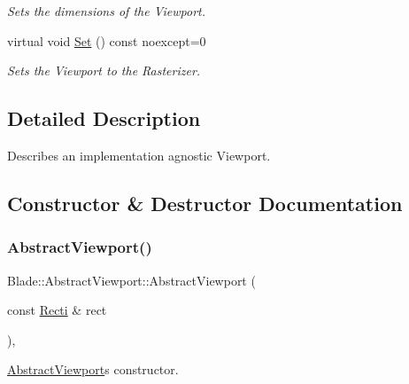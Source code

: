 \begin{DoxyCompactItemize}
\begin{DoxyCompactList}\small\item\em Sets the dimensions of the Viewport. \end{DoxyCompactList}\item 
\mbox{\label{class_blade_1_1_abstract_viewport_a5ea486e1fbae3f6725cac10353644f24}} 
virtual void \hyperlink{class_blade_1_1_abstract_viewport_a5ea486e1fbae3f6725cac10353644f24}{Set} () const noexcept=0
\begin{DoxyCompactList}\small\item\em Sets the Viewport to the Rasterizer. \end{DoxyCompactList}\end{DoxyCompactItemize}


\subsection{Detailed Description}
Describes an implementation agnostic Viewport. 

\subsection{Constructor \& Destructor Documentation}
\mbox{\label{class_blade_1_1_abstract_viewport_aa04544ba6e933bc0e6c2e6ca878d4541}} 
\subsubsection{\texorpdfstring{Abstract\+Viewport()}{AbstractViewport()}}
{\footnotesize\ttfamily Blade\+::\+Abstract\+Viewport\+::\+Abstract\+Viewport (\begin{DoxyParamCaption}\item[{const \hyperlink{namespace_blade_ac765e9c5c8205009994e4243d9d6f81c}{Recti} \&}]{rect }\end{DoxyParamCaption})\hspace{0.3cm}{\ttfamily [inline]}, {\ttfamily [explicit]}}



\hyperlink{class_blade_1_1_abstract_viewport}{Abstract\+Viewport}\textquotesingle{}s constructor. 


